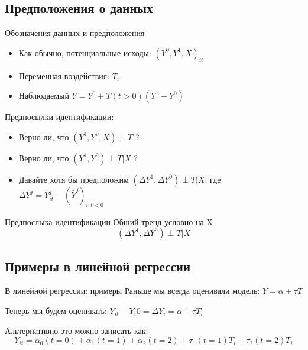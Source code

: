 \subsection{Предположения о данных}

\begin{frame}{Обозначения данных и предположения}
    \begin{itemize}
        \item Как обычно, потенциальные исходы: $(Y^0, Y^1, X)_{it}$
        \item Переменная воздействия: $T_{i}$
        \item Наблюдаемый $Y = Y^0 + T (t > 0) (Y^1 - Y^0)$
    \end{itemize}
    \pause
    Предпосылки идентификации:
    \begin{itemize}[<+->]
        \item Верно ли, что $(Y^1, Y^0, X) \perp T$ ?
        \item Верно ли, что $(Y^1, Y^0) \perp T | X$ ?
        \item Давайте хотя бы предположим $(\Delta Y^1, \Delta Y^0) \perp T | X$, где
        $\Delta Y^j = Y^j_{it} - (\bar Y^j)_{i, t < 0}$

    \end{itemize}
\end{frame}

\begin{frame}{Предпослыка идентификации}
    Общий тренд условно на X
    $$(\Delta Y^1, \Delta Y^0) \perp T | X$$
\end{frame}


\subsection{Примеры в линейной регрессии}


\begin{frame}{В линейной регрессии: примеры}
    Раньше мы всегда оценивали модель: $Y = \alpha + \tau T$
    
    Теперь мы будем оценивать: $Y_{it} - Y_i0 = \Delta Y_i = \alpha + \tau T_i$
    
    Альтернативно это можно записать как: 
    $$Y_{it} = \alpha_0 (t=0) + \alpha_1  (t=1) + \alpha_2 (t=2) + \tau_1 (t=1) T_{i} + \tau_2 (t=2) T_{i}$$
    
\end{frame}


    
